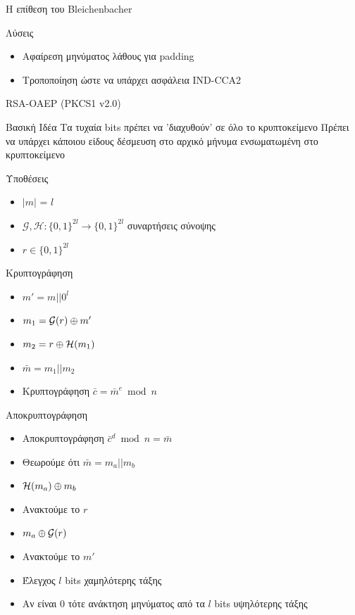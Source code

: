 \documentclass[handout]{beamer}
\begin{document}
\begin{frame}[allowframebreaks]{Η επίθεση του Bleichenbacher}
\begin{block}{Λύσεις}
\begin{itemize}
    \item Αφαίρεση μηνύματος λάθους για padding
    \item Τροποποίηση ώστε να υπάρχει ασφάλεια IND-CCA2 
\end{itemize}


\end{block}


\end{frame}

\begin{frame}[allowframebreaks]{RSA-OAEP (PKCS1 v2.0)}
\begin{block}{Βασική Ιδέα}
Τα τυχαία bits πρέπει να 'διαχυθούν' σε όλο το κρυπτοκείμενο
Πρέπει να υπάρχει κάποιου είδους δέσμευση στο αρχικό μήνυμα ενσωματωμένη στο κρυπτοκείμενο
\end{block}

\begin{block}{Υποθέσεις}
\begin{itemize}
\item $|m|$ = $l$
\item $\mathcal{G}, \mathcal{H} : \{0,1\}^{2l} \rightarrow \{0,1\}^{2l}$ συναρτήσεις σύνοψης
\item $r \in \{0,1\}^{2l}$
\end{itemize}
\end{block}


\framebreak 
 
\begin{block}{Κρυπτογράφηση}
\begin{itemize}
\item $m' = m || 0^l$
\item $m_1 = \mathcal{G}(r) \oplus m'$
\item $m_2 = r \oplus \mathcal{H}(m_1)$
\item $\bar{m} = m_1 || m_2$
\item Κρυπτογράφηση $\bar{c} = \bar{m}^e \bmod n$
\end{itemize}
\end{block}

\framebreak 

\begin{block}{Αποκρυπτογράφηση}
\begin{itemize}
\item Αποκρυπτογράφηση $\bar{c}^d \bmod n = \bar m$
\item Θεωρούμε ότι $\bar{m} = m_a || m_b$
\item $\mathcal{H}(m_a) \oplus m_b$
\item Ανακτούμε το $r$
\item $m_a \oplus \mathcal{G}(r)$
\item Ανακτούμε το $m'$
\item Έλεγχος $l$ bits χαμηλότερης τάξης
\item Αν είναι 0 τότε ανάκτηση μηνύματος από τα $l$ bits υψηλότερης τάξης
\end{itemize}
\end{block}


\end{frame}
\end{document}
